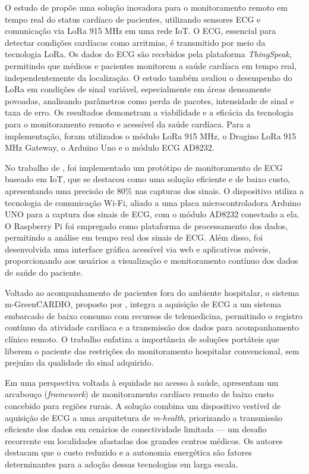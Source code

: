 O estudo de \cite{9920379} propõe uma solução inovadora para o monitoramento remoto em tempo real do status cardíaco de pacientes, utilizando sensores ECG e comunicação via LoRa 915 MHz em uma rede \acs{IoT}. O ECG, essencial para detectar condições cardíacas como arritmias, é transmitido por meio da tecnologia LoRa. Os dados do ECG são recebidos pela plataforma \textit{ThingSpeak}, permitindo que médicos e pacientes monitorem a saúde cardíaca em tempo real, independentemente da localização. O estudo também avaliou o desempenho do LoRa em condições de sinal variável, especialmente em áreas densamente povoadas, analisando parâmetros como perda de pacotes, intensidade de sinal e taxa de erro. Os resultados demonstram a viabilidade e a eficácia da tecnologia para o monitoramento remoto e acessível da saúde cardíaca. Para a implementação, foram utilizados o módulo LoRa 915 MHz, o Dragino LoRa 915 MHz Gateway, o Arduino Uno e o módulo ECG AD8232.

No trabalho de \cite{8934622}, foi implementado um protótipo de monitoramento de ECG baseado em \acs{IoT}, que se destacou como uma solução eficiente e de baixo custo, apresentando uma precisão de 80\% nas capturas dos sinais. O dispositivo utiliza a tecnologia de comunicação Wi-Fi, aliado a uma placa microcontroladora Arduino UNO para a captura dos sinais de ECG, com o módulo AD8232 conectado a ela. O Raspberry Pi foi empregado como plataforma de processamento dos dados, permitindo a análise em tempo real dos sinais de ECG. Além disso, foi desenvolvida uma interface gráfica acessível via web e aplicativos móveis, proporcionando aos usuários a visualização e monitoramento contínuo dos dados de saúde do paciente.

Voltado ao acompanhamento de pacientes fora do ambiente hospitalar, o sistema m-GreenCARDIO, proposto por \cite{mGreen}, integra a aquisição de \acs{ECG} a um sistema embarcado de baixo consumo com recursos de telemedicina, permitindo o registro contínuo da atividade cardíaca e a transmissão dos dados para acompanhamento clínico remoto. O trabalho enfatiza a importância de soluções portáteis que liberem o paciente das restrições do monitoramento hospitalar convencional, sem prejuízo da qualidade do sinal adquirido.

Em uma perspectiva voltada à equidade no acesso à saúde, \cite{dispLowCost} apresentam um arcabouço (\textit{framework}) de monitoramento cardíaco remoto de baixo custo concebido para regiões rurais. A solução combina um dispositivo vestível de aquisição de \acs{ECG} a uma arquitetura de \textit{m-health}, priorizando a transmissão eficiente dos dados em cenários de conectividade limitada — um desafio recorrente em localidades afastadas dos grandes centros médicos. Os autores destacam que o custo reduzido e a autonomia energética são fatores determinantes para a adoção dessas tecnologias em larga escala.

